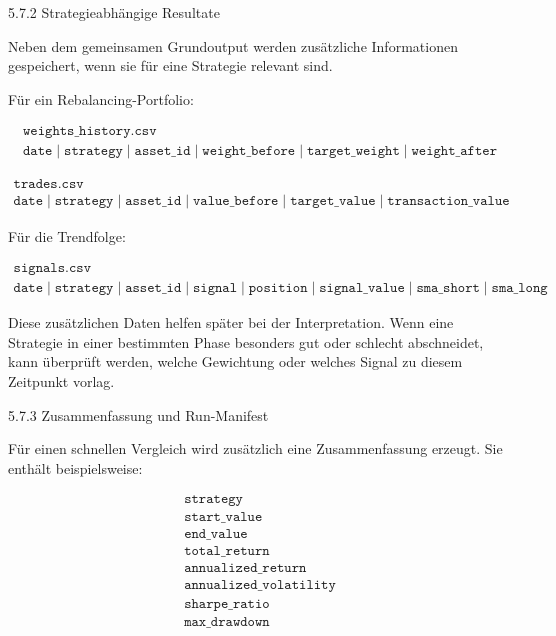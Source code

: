\documentclass[
  ngerman,
  a4paper,
  DIV=11,
  oneside]{scrreprt}
\begin{document}
5.7.2 Strategieabhängige Resultate

Neben dem gemeinsamen Grundoutput werden zusätzliche Informationen
gespeichert, wenn sie für eine Strategie relevant sind.

Für ein Rebalancing-Portfolio:

\[
\begin{array}{l}
\texttt{weights\_history.csv} \\[6pt]
\texttt{date} \;|\; \texttt{strategy} \;|\; \texttt{asset\_id} \;|\; \texttt{weight\_before} \;|\; \texttt{target\_weight} \;|\; \texttt{weight\_after}
\end{array}
\]

\[
\begin{array}{l}
\texttt{trades.csv} \\[6pt]
\texttt{date} \;|\; \texttt{strategy} \;|\; \texttt{asset\_id} \;|\; \texttt{value\_before} \;|\; \texttt{target\_value} \;|\; \texttt{transaction\_value}
\end{array}
\]

Für die Trendfolge:

\[
\begin{array}{l}
\texttt{signals.csv} \\[6pt]
\texttt{date} \;|\; \texttt{strategy} \;|\; \texttt{asset\_id} \;|\; \texttt{signal} \;|\; \texttt{position} \;|\; \texttt{signal\_value} \;|\; \texttt{sma\_short} \;|\; \texttt{sma\_long}
\end{array}
\]

Diese zusätzlichen Daten helfen später bei der Interpretation. Wenn eine
Strategie in einer bestimmten Phase besonders gut oder schlecht
abschneidet, kann überprüft werden, welche Gewichtung oder welches
Signal zu diesem Zeitpunkt vorlag.

5.7.3 Zusammenfassung und Run-Manifest

Für einen schnellen Vergleich wird zusätzlich eine Zusammenfassung
erzeugt. Sie enthält beispielsweise:

\[
\begin{array}{l}
\texttt{strategy} \\
\texttt{start\_value} \\
\texttt{end\_value} \\
\texttt{total\_return} \\
\texttt{annualized\_return} \\
\texttt{annualized\_volatility} \\
\texttt{sharpe\_ratio} \\
\texttt{max\_drawdown}
\end{array}
\]
\end{document}
